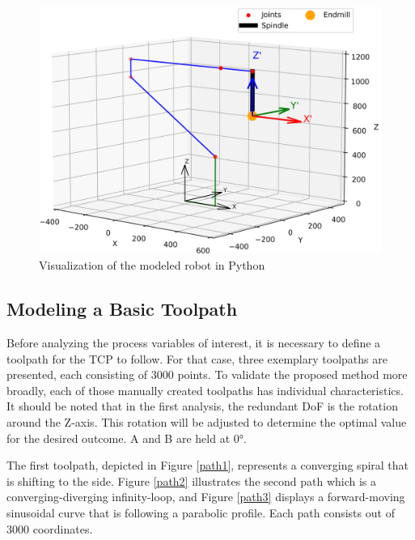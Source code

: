  \begin{figure}[H]
	\centerline{\includegraphics[width=1\textwidth]{figures/robotprog.png}}
	\caption{Visualization of the modeled robot in Python}
	\label{robotprog}
\end{figure}


\subsection{Modeling a Basic Toolpath}\label{MBT}
Before analyzing the process variables of interest, it is necessary to define a toolpath for the \acrshort{TCP} to follow. For that case, three exemplary toolpaths are presented, each consisting of 3000 points. To validate the proposed method more broadly, each of those manually created toolpaths has individual characteristics. It should be noted that in the first analysis, the redundant \acrshort{DoF} is the rotation around the Z-axis. This rotation will be adjusted to determine the optimal value for the desired outcome. A and B are held at 0°.

The first toolpath, depicted in Figure \ref{path1}, represents a converging spiral that is shifting to the side. Figure \ref{path2} illustrates the second path which is a converging-diverging infinity-loop, and Figure \ref{path3} displays a forward-moving sinusoidal curve that is following a parabolic profile. Each path consists out of 3000 coordinates. %

